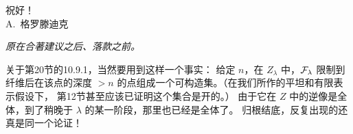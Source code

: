 \begin{flushright}
祝好！\\[3pt]
A.~格罗滕迪克
\end{flushright}

\noindent\emph{原在合著建议之后、落款之前。}

关于第20节的10.9.1，当然要用到这样一个事实：
给定 \(n\)，在 \(Z_\lambda\) 中，\(\mathcal F_\lambda\) 限制到纤维后在该点的深度
\(>n\) 的点组成一个可构造集。（在我们所作的平坦和有限表示假设下，
第12节甚至应该已证明这个集合是开的。）
由于它在 \(Z\) 中的逆像是全体，到了稍晚于 \(\lambda\) 的某一阶段，那里也已经是全体了。
归根结底，反复出现的还真是同一个论证！
\par\endgroup
